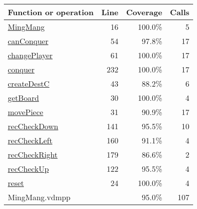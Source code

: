 \begin{longtable}{|l|r|r|r|}
\hline
Function or operation & Line & Coverage & Calls \\
\hline
\hline
\hyperref[MingMang:16]{MingMang} & 16&100.0\% & 5 \\
\hline
\hyperref[canConquer:54]{canConquer} & 54&97.8\% & 17 \\
\hline
\hyperref[changePlayer:61]{changePlayer} & 61&100.0\% & 17 \\
\hline
\hyperref[conquer:232]{conquer} & 232&100.0\% & 17 \\
\hline
\hyperref[createDestC:43]{createDestC} & 43&88.2\% & 6 \\
\hline
\hyperref[getBoard:30]{getBoard} & 30&100.0\% & 4 \\
\hline
\hyperref[movePiece:31]{movePiece} & 31&90.9\% & 17 \\
\hline
\hyperref[recCheckDown:141]{recCheckDown} & 141&95.5\% & 10 \\
\hline
\hyperref[recCheckLeft:160]{recCheckLeft} & 160&91.1\% & 4 \\
\hline
\hyperref[recCheckRight:179]{recCheckRight} & 179&86.6\% & 2 \\
\hline
\hyperref[recCheckUp:122]{recCheckUp} & 122&95.5\% & 4 \\
\hline
\hyperref[reset:24]{reset} & 24&100.0\% & 4 \\
\hline
\hline
MingMang.vdmpp & & 95.0\% & 107 \\
\hline
\end{longtable}

